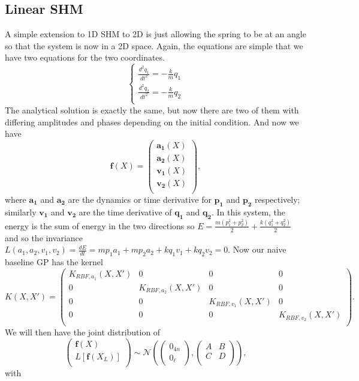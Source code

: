 \documentclass{statsmsc}
\begin{document}
\subsection{Linear SHM}
A simple extension to 1D SHM to 2D is just allowing the spring to be at an angle so that the system is now in a 2D space.
Again, the equations are simple that we have two equations for the two coordinates.
$$
\begin{cases}
    \frac{d^2{q_1}}{dt^2} = -\frac{k}{m}q_1\\
    \frac{d^2{q_2}}{dt^2} = -\frac{k}{m}q_2\\
\end{cases}
$$
The analytical solution is exactly the same, but now there are two of them with differing amplitudes and phases depending on the initial condition. 
And now we have $$\mathbf{f}(X)=\begin{pmatrix}
    \mathbf{a_1}(X)\\
    \mathbf{a_2}(X)\\
    \mathbf{v_1}(X)\\
    \mathbf{v_2}(X)\\
\end{pmatrix},$$
where $\mathbf{a_1}$ and $\mathbf{a_2}$ are the dynamics or time derivative for $\mathbf{p_1}$ and $\mathbf{p_2}$ respectively; similarly $\mathbf{v_1}$ and $\mathbf{v_2}$ are the time derivative of $\mathbf{q_1}$ and $\mathbf{q_2}$.
In this system, the energy is the sum of energy in the two directions so $E=\frac{m(p_1^2+p_2^2)}{2}+\frac{k(q_1^2+q_2^2)}{2}$ and so the invariance $L(a_1, a_2, v_1, v_2)=\frac{dE}{dt}=mp_1a_1+mp_2a_2+kq_1v_1+kq_2v_2=0.$
Now our naive baseline GP has the kernel
$$
K(X,X')=\begin{pmatrix}
K_{RBF,a_1}(X,X') & 0 & 0 & 0 \\
0 & K_{RBF,a_2}(X,X') & 0 & 0 \\
0 & 0 & K_{RBF,v_1}(X,X') & 0 \\
0 & 0 & 0 & K_{RBF,v_2}(X,X') \\
\end{pmatrix}.
$$
We will then have the joint distribution of
$$
\begin{pmatrix}
    \mathbf{f}(X)\\L[\mathbf{f}(X_L)]\\
\end{pmatrix}
\sim\mathcal{N}
\left(
\begin{pmatrix}
    0_{4n} \\ 0_{\ell}
\end{pmatrix},
\begin{pmatrix}
    A & B \\
    C & D\\
\end{pmatrix}
\right),
$$
with 
\end{document}
